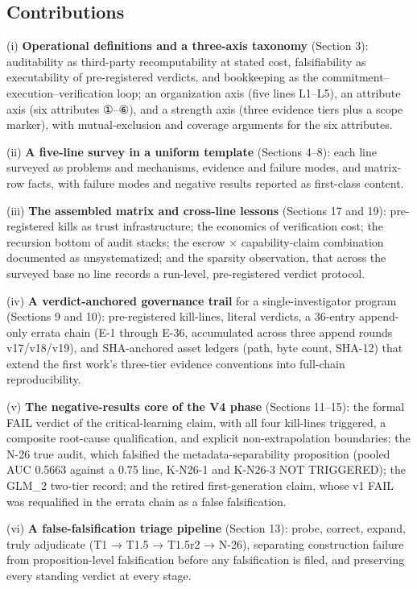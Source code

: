 \documentclass[11pt]{article}
\begin{document}
\subsection{Contributions}
\noindent (i) \textbf{Operational definitions and a three-axis taxonomy} (Section 3): auditability as third-party recomputability at stated cost, falsifiability as executability of pre-registered verdicts, and bookkeeping as the commitment–execution–verification loop; an organization axis (five lines L1–L5), an attribute axis (six attributes ①–⑥), and a strength axis (three evidence tiers plus a scope marker), with mutual-exclusion and coverage arguments for the six attributes.\par
\noindent (ii) \textbf{A five-line survey in a uniform template} (Sections 4–8): each line surveyed as problems and mechanisms, evidence and failure modes, and matrix-row facts, with failure modes and negative results reported as first-class content.\par
\noindent (iii) \textbf{The assembled matrix and cross-line lessons} (Sections 17 and 19): pre-registered kills as trust infrastructure; the economics of verification cost; the recursion bottom of audit stacks; the escrow × capability-claim combination documented as unsystematized; and the sparsity observation, that across the surveyed base no line records a run-level, pre-registered verdict protocol.\par
\noindent (iv) \textbf{A verdict-anchored governance trail} for a single-investigator program (Sections 9 and 10): pre-registered kill-lines, literal verdicts, a 36-entry append-only errata chain (E-1 through E-36, accumulated across three append rounds v17/v18/v19), and SHA-anchored asset ledgers (path, byte count, SHA-12) that extend the first work's three-tier evidence conventions into full-chain reproducibility.\par
\noindent (v) \textbf{The negative-results core of the V4 phase} (Sections 11–15): the formal FAIL verdict of the critical-learning claim, with all four kill-lines triggered, a composite root-cause qualification, and explicit non-extrapolation boundaries; the N-26 true audit, which falsified the metadata-separability proposition (pooled AUC 0.5663 against a 0.75 line, K-N26-1 and K-N26-3 NOT TRIGGERED); the GLM\_2 two-tier record; and the retired first-generation claim, whose v1 FAIL was requalified in the errata chain as a false falsification.\par
\noindent (vi) \textbf{A false-falsification triage pipeline} (Section 13): probe, correct, expand, truly adjudicate (T1 → T1.5 → T1.5r2 → N-26), separating construction failure from proposition-level falsification before any falsification is filed, and preserving every standing verdict at every stage.\par
\end{document}
